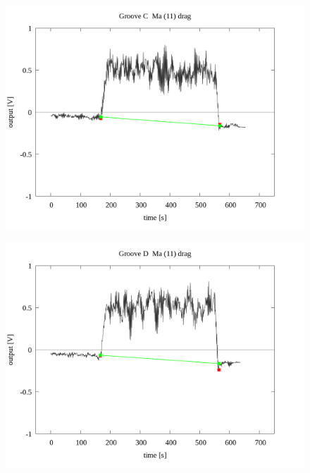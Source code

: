 \documentclass[a4paper]{jsarticle}
\begin{document}
\begin{figure}[htbp]
    \footnotesize
    \begin{center}
        \includegraphics[width=140mm]{../../../../33_result/210806/moving_average/11/drag/03/Groove_C_ma(11)_drag_03.png}
    \end{center}
\end{figure}

\begin{figure}[htbp]
    \footnotesize
    \begin{center}
        \includegraphics[width=140mm]{../../../../33_result/210806/moving_average/11/drag/03/Groove_D_ma(11)_drag_03.png}
    \end{center}
\end{figure}
\end{document}
